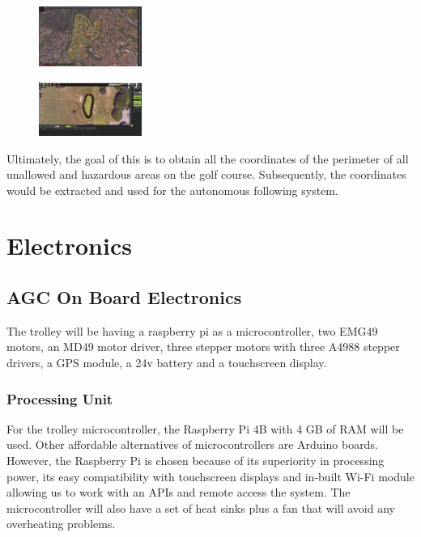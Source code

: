 \documentclass[11pt,landscape]{article}
\begin{document}
\begin{multicols}{3}
\begin{figure}[H]
    \begin{center}
        \includegraphics[width=0.3\textwidth]{Municipal.png}
    \end{center}
    \label{fig:mission_planer}
\end{figure}

\begin{figure}[H]
    \begin{center}
        \includegraphics[width=0.3\textwidth]{polygon 1.png}
    \end{center}
    \label{fig:polygon1}
\end{figure}

Ultimately, the goal of this is to obtain all the coordinates of the perimeter
of all unallowed and hazardous areas on the golf course. Subsequently, the
coordinates would be extracted and used for the autonomous following system.


\section{Electronics}
\label{electronics}
\subsection{AGC On Board Electronics}
The trolley will be having a raspberry pi as a microcontroller, two EMG49
motors, an MD49 motor driver, three stepper motors with three A4988 stepper
drivers, a GPS module, a 24v battery and a touchscreen display.

\subsubsection{Processing Unit}
For the trolley microcontroller, the Raspberry Pi 4B with 4 GB of RAM will be
used. Other affordable alternatives of microcontrollers are Arduino boards.
However, the Raspberry Pi is chosen because of its superiority in processing
power, its easy compatibility with touchscreen displays and in-built Wi-Fi
module allowing us to work with an APIs and remote access the system. The
microcontroller will also have a set of heat sinks plus a fan that will avoid
any overheating problems.



\end{multicols}
\end{document}
